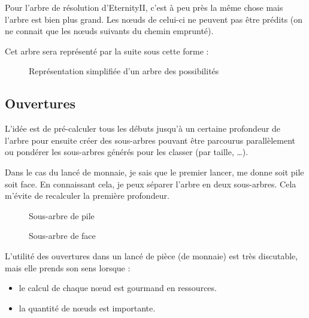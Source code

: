 	\begin{note}
		Pour l'arbre de résolution d'EternityII, c'est à peu près la même chose mais l'arbre est bien plus grand. Les n\oe uds de celui-ci ne peuvent pas être prédits (on ne connait que les n\oe uds suivants du chemin emprunté).
	\end{note}

	Cet arbre sera représenté par la suite sous cette forme :
	\begin{figure}[H]
	   	\begin{center}
	   			
	   	\end{center}
	   	
	   	\caption{Représentation simplifiée d'un arbre des possibilités}
	   	\label{fig:arbre}
	\end{figure}
	 \newpage

	\subsection{Ouvertures}
	
	L'idée est de pré-calculer tous les débuts jusqu'à un certaine profondeur de l'arbre pour ensuite créer des sous-arbres pouvant être parcourus parallèlement ou pondérer les sous-arbres générés pour les classer (par taille, \dots).
	
	\begin{exmp}
		Dans le cas du lancé de monnaie, je sais que le premier lancer, me donne soit pile soit face. En connaissant cela, je peux séparer l'arbre en deux sous-arbres. Cela m'évite de recalculer la première profondeur.
		
		\begin{figure}[H]
			\begin{center}
				
			\end{center}
			\caption{Sous-arbre de pile}\label{fig:sous-arbre-pile}
			\endminipage\hfill
			\begin{center}
				
			\end{center}
			\caption{Sous-arbre de face}\label{fig:sous-arbre-face}
			\endminipage\hfill
		\end{figure}
	\end{exmp}
	
	\begin{rem}
		L'utilité des ouvertures dans un lancé de pièce (de monnaie) est très discutable, mais elle prends son sens lorsque :
		
		\begin{itemize}
			\item le calcul de chaque n\oe ud est gourmand en ressources.
			\item la quantité de n\oe uds est importante.
		\end{itemize}  
	\end{rem}
	
